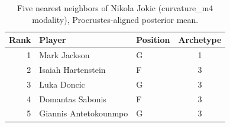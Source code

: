 \begin{table}[htbp]
  \centering\small
  \begin{tabular}{rllc}
    \toprule
    Rank & Player & Position & Archetype \\
    \midrule
    1 & Mark Jackson & G & 1 \\
    2 & Isaiah Hartenstein & F & 3 \\
    3 & Luka Doncic & G & 3 \\
    4 & Domantas Sabonis & F & 3 \\
    5 & Giannis Antetokounmpo & G & 3 \\
    \bottomrule
  \end{tabular}
  \caption{Five nearest neighbors of Nikola Jokic (curvature_m4 modality), Procrustes-aligned posterior mean.}
  \label{tab:Nikola_Jokic_neighbors_curvature_m4}
\end{table}

